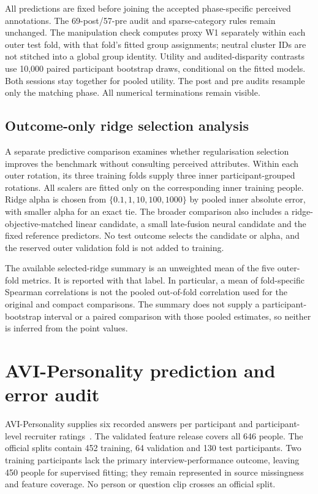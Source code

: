 All predictions are fixed before joining the accepted phase-specific perceived annotations.
The 69-post/57-pre audit and sparse-category rules remain unchanged. The manipulation check
computes proxy W1 separately within each outer test fold, with that fold's fitted group
assignments; neutral cluster IDs are not stitched into a global group identity. Utility and
audited-disparity contrasts use 10,000 paired participant bootstrap draws, conditional on
the fitted models. Both sessions stay together for pooled utility. The post and pre audits
resample only the matching phase. All numerical terminations remain visible.

\subsection{Outcome-only ridge selection analysis}

A separate predictive comparison examines whether regularisation selection improves the
benchmark without consulting perceived attributes. Within each outer rotation, its three
training folds supply three inner participant-grouped rotations. All scalers are fitted
only on the corresponding inner training people. Ridge alpha is chosen from
$\{0.1,1,10,100,1000\}$ by pooled inner absolute error, with smaller alpha for an exact tie.
The broader comparison also includes a ridge-objective-matched linear candidate, a small
late-fusion neural candidate and the fixed reference predictors. No test outcome selects
the candidate or alpha, and the reserved outer validation fold is not added to training.

The available selected-ridge summary is an unweighted mean of the five outer-fold metrics.
It is reported with that label. In particular, a mean of fold-specific Spearman correlations
is not the pooled out-of-fold correlation used for the original and compact comparisons.
The summary does not supply a participant-bootstrap interval or a paired comparison with
those pooled estimates, so neither is inferred from the point values.

\section{AVI-Personality prediction and error audit}
\label{sec:avi-method}

AVI-Personality supplies six recorded answers per participant and participant-level
recruiter ratings~\cite{Zhang2026AVI}. The validated feature release covers all 646 people.
The official splits contain 452 training, 64 validation and 130 test participants. Two
training participants lack the primary interview-performance outcome, leaving 450 people
for supervised fitting; they remain represented in source missingness and feature coverage.
No person or question clip crosses an official split.

